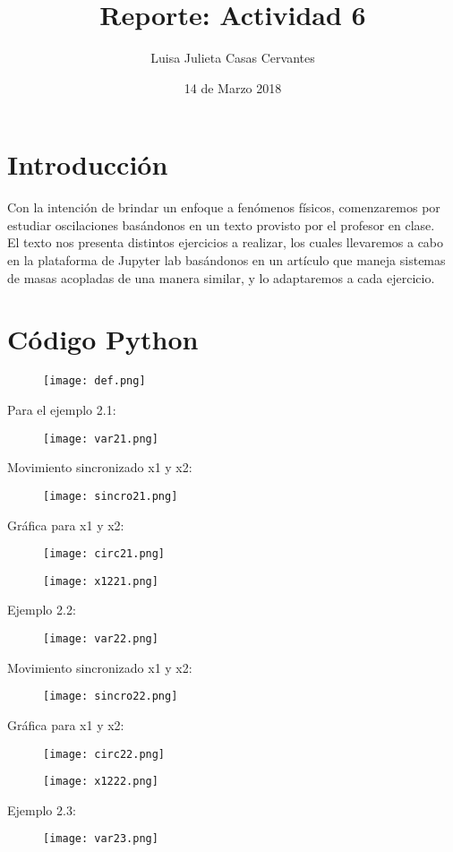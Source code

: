 \documentclass{article}
\title{Reporte: Actividad 6}
\author{Luisa Julieta Casas Cervantes}
\date{14 de Marzo 2018}
\begin{document}
\maketitle
\section{Introducción}
Con la intención de brindar un enfoque a fenómenos físicos, comenzaremos por estudiar oscilaciones basándonos en un texto provisto por el profesor en clase.
\\El texto nos presenta distintos ejercicios a realizar, los cuales llevaremos a cabo en la plataforma de Jupyter lab basándonos en un artículo que maneja sistemas de masas acopladas de una manera similar, y lo adaptaremos a cada ejercicio.
\section{Código Python}
\begin{figure}[H]
\texttt{[image: def.png]}
\end{figure}
Para el ejemplo 2.1:
\begin{figure}[H]
\texttt{[image: var21.png]}
\end{figure}
Movimiento sincronizado x1 y x2:
\begin{figure}[H]
\texttt{[image: sincro21.png]}
\end{figure}
Gráfica para x1 y x2:
\begin{figure}[H]
\texttt{[image: circ21.png]}
\end{figure}
\begin{figure}[H]
\texttt{[image: x1221.png]}
\end{figure}
Ejemplo 2.2:
\begin{figure}[H]
\texttt{[image: var22.png]}
\end{figure}
Movimiento sincronizado x1 y x2:
\begin{figure}[H]
\texttt{[image: sincro22.png]}
\end{figure}
Gráfica para x1 y x2:
\begin{figure}[H]
\texttt{[image: circ22.png]}
\end{figure}
\begin{figure}[H]
\texttt{[image: x1222.png]}
\end{figure}
Ejemplo 2.3:
\begin{figure}[H]
\texttt{[image: var23.png]}
\end{figure}
\end{document}
